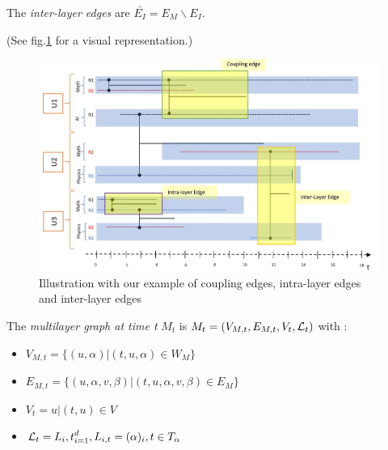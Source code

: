 \documentclass[dvipsnames,a4paper,11pt]{article}
\theoremstyle{definition}
\theoremstyle{remark}
\theoremstyle{remark}
\begin{document}
    The {\em inter-layer edges} are $\bar{E_I} = E_M\backslash E_I$.
    
	(See fig.\ref{exIntraInter} for a visual representation.)
	
	\begin{figure}[h]
		\centering
		\includegraphics[width=\textwidth]{schemas/edgesCat.jpg}
		\caption{Illustration with our example of coupling edges, intra-layer edges and inter-layer edges}
		\label{exIntraInter}
	\end{figure}
   	The {\em multilayer graph at time t} $M_t$ is $M_t = (V_{M,t}, E_{M,t},V_t,{\cal L}_t)$ with :
    \begin{itemize}
		\item $V_{M,t} = \{(u,\alpha)| (t,u,\alpha)\in W_M\}$
		\item $E_{M,t} = \{(u,\alpha,v,\beta) | (t,u,\alpha,v,\beta) \in E_M\}$
		\item $V_t = {u | (t,u) \in V}$
		\item ${\cal L}_t = {L_i,t}_{i=1}^d, L_{i,t}=(\alpha)_i, t\in T_\alpha$
    \end{itemize}
\end{document}

